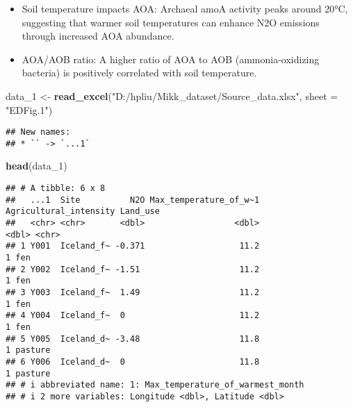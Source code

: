 \documentclass[
]{article}
\newenvironment{Shaded}{\begin{snugshade}}{\end{snugshade}}
\newcommand{\AttributeTok}[1]{\textcolor[rgb]{0.13,0.29,0.53}{#1}}
\newcommand{\FloatTok}[1]{\textcolor[rgb]{0.00,0.00,0.81}{#1}}
\newcommand{\FunctionTok}[1]{\textcolor[rgb]{0.13,0.29,0.53}{\textbf{#1}}}
\newcommand{\NormalTok}[1]{#1}
\newcommand{\OtherTok}[1]{\textcolor[rgb]{0.56,0.35,0.01}{#1}}
\newcommand{\SpecialCharTok}[1]{\textcolor[rgb]{0.81,0.36,0.00}{\textbf{#1}}}
\newcommand{\StringTok}[1]{\textcolor[rgb]{0.31,0.60,0.02}{#1}}
\providecommand{\tightlist}{%
  \setlength{\itemsep}{0pt}\setlength{\parskip}{0pt}}
\begin{document}
\begin{itemize}
\tightlist
\item
  Soil temperature impacts AOA: Archaeal amoA activity peaks around
  20°C, suggesting that warmer soil temperatures can enhance N2O
  emissions through increased AOA abundance.
\item
  AOA/AOB ratio: A higher ratio of AOA to AOB (ammonia-oxidizing
  bacteria) is positively correlated with soil temperature.
\end{itemize}

\begin{Shaded}
\begin{Highlighting}[]
\NormalTok{data\_1 }\OtherTok{\textless{}{-}} \FunctionTok{read\_excel}\NormalTok{(}\StringTok{"D:/hpliu/Mikk\_dataset/Source\_data.xlsx"}\NormalTok{, }\AttributeTok{sheet =} \StringTok{"EDFig.1"}\NormalTok{)}
\end{Highlighting}
\end{Shaded}

\begin{verbatim}
## New names:
## * `` -> `...1`
\end{verbatim}

\begin{Shaded}
\begin{Highlighting}[]
\FunctionTok{head}\NormalTok{(data\_1)}
\end{Highlighting}
\end{Shaded}

\begin{verbatim}
## # A tibble: 6 x 8
##   ...1  Site          N2O Max_temperature_of_w~1 Agricultural_intensity Land_use
##   <chr> <chr>       <dbl>                  <dbl>                  <dbl> <chr>   
## 1 Y001  Iceland_f~ -0.371                   11.2                      1 fen     
## 2 Y002  Iceland_f~ -1.51                    11.2                      1 fen     
## 3 Y003  Iceland_f~  1.49                    11.2                      1 fen     
## 4 Y004  Iceland_f~  0                       11.2                      1 fen     
## 5 Y005  Iceland_d~ -3.48                    11.8                      1 pasture 
## 6 Y006  Iceland_d~  0                       11.8                      1 pasture 
## # i abbreviated name: 1: Max_temperature_of_warmest_month
## # i 2 more variables: Longitude <dbl>, Latitude <dbl>
\end{verbatim}

\begin{Shaded}
\end{Shaded}
\end{document}
